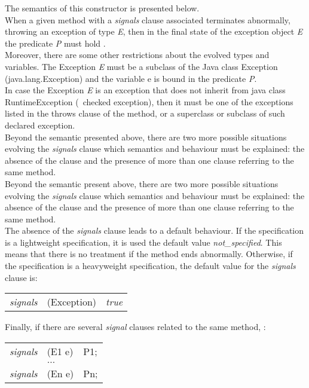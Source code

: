 The semantics of this constructor is presented below.\\
When a given method with a \textit{signals} clause associated terminates abnormally, throwing an exception of type \textit{E}, then in the final state of the exception object \textit{E} the predicate \textit{P} must hold \cite{leavens-etal07}.\\
Moreover, there are some other restrictions about the evolved types and variables. The Exception \textit{E} must be a subclass of the Java class Exception (java.lang.Exception) and the variable e is bound in the predicate \textit{P}.\\
In case the Exception \textit{E} is an exception that does not inherit from java class RuntimeException (\ie\ checked exception), then it must be one of the exceptions listed in the throws clause of the method, or a superclass or subclass of such declared exception.\\
Beyond the semantic presented above, there are two more possible situations evolving the \textit{signals} clause which semantics and behaviour must be explained: the absence of the clause and the presence of more than one clause referring to the same method.\\
Beyond the semantic present above, there are two more possible situations evolving the \textit{signals} clause which semantics and behaviour must be explained: the absence of the clause and the presence of more than one clause referring to the same method.\\
The absence of the \textit{signals} clause leads to a default behaviour. If the specification is a lightweight specification, it is used the default value \textit{not\_specified}. This means that there is no treatment if the method ends abnormally. Otherwise, if the specification is a heavyweight specification, the default value for the \textit{signals} clause is:

\begin{center}
\begin{tabular}{lll}
\textit{signals} & (Exception) & \textit{true}\\
\end{tabular}
\end{center}

Finally, if there are several \textit{signal} clauses related to the same method, \ie:  

\begin{center}
\begin{tabular}{lll}
\textit{signals} & (E1 e) & P1;\\
 & $\ldots$ & \\
\textit{signals} & (En e) & Pn;\\
\end{tabular}
\end{center}

